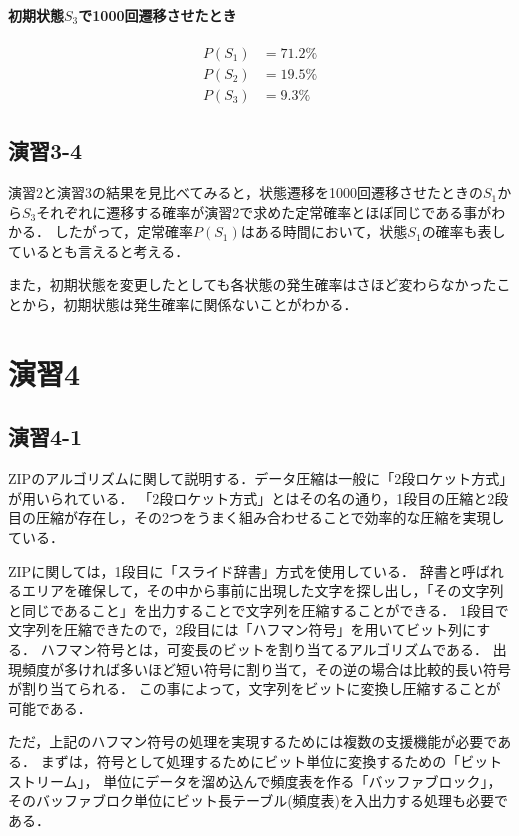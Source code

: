 \documentclass[documentclass]{jsarticle}
\begin{document}
\paragraph*{初期状態$S_3$で1000回遷移させたとき}
\begin{align*}
  P(S_1) &= 71.2\%\\
  P(S_2) &= 19.5\%\\
  P(S_3) &= 9.3\%
\end{align*}

\subsection*{演習3-4}
演習2と演習3の結果を見比べてみると，状態遷移を1000回遷移させたときの$S_1$から$S_3$それぞれに遷移する確率が演習2で求めた定常確率とほぼ同じである事がわかる．
したがって，定常確率$P(S_1)$はある時間において，状態$S_1$の確率も表しているとも言えると考える．

また，初期状態を変更したとしても各状態の発生確率はさほど変わらなかったことから，初期状態は発生確率に関係ないことがわかる．

\newpage

\section*{演習4}
\subsection*{演習4-1}
ZIPのアルゴリズムに関して説明する．データ圧縮は一般に「2段ロケット方式」が用いられている．
「2段ロケット方式」とはその名の通り，1段目の圧縮と2段目の圧縮が存在し，その2つをうまく組み合わせることで効率的な圧縮を実現している．

ZIPに関しては，1段目に「スライド辞書」方式を使用している．
辞書と呼ばれるエリアを確保して，その中から事前に出現した文字を探し出し，「その文字列と同じであること」を出力することで文字列を圧縮することができる．
1段目で文字列を圧縮できたので，2段目には「ハフマン符号」を用いてビット列にする．
ハフマン符号とは，可変長のビットを割り当てるアルゴリズムである．
出現頻度が多ければ多いほど短い符号に割り当て，その逆の場合は比較的長い符号が割り当てられる．
この事によって，文字列をビットに変換し圧縮することが可能である．

ただ，上記のハフマン符号の処理を実現するためには複数の支援機能が必要である．
まずは，符号として処理するためにビット単位に変換するための「ビットストリーム」，
単位にデータを溜め込んで頻度表を作る「バッファブロック」，
そのバッファブロク単位にビット長テーブル(頻度表)を入出力する処理も必要である．
\end{document}
